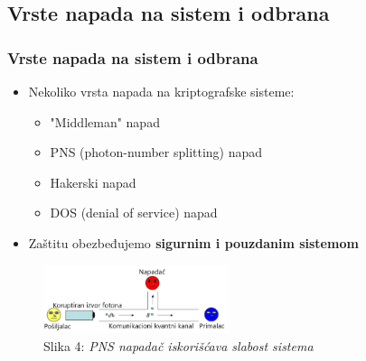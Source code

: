 \documentclass{beamer}
\begin{document}
\subsection{Vrste napada na sistem i odbrana}
\begin{frame}[fragile]\frametitle{Vrste napada na sistem i odbrana}
\bigskip
	\begin{itemize}	
	  \item Nekoliko vrsta napada na kriptografske sisteme:
        \begin{itemize}
            \item "Middleman" napad
            \item PNS (photon-number splitting) napad
            \item Hakerski napad
            \item DOS (denial of service) napad
        \end{itemize}
        \item Zaštitu obezbeđujemo\bf{ sigurnim i pouzdanim sistemom} 
        
	\end{itemize}
    \begin{figure}[h!]
        \centering\includegraphics[height=2cm]{sl3.png} 
        \caption{Slika 4: \emph{PNS napadač iskorišćava slabost sistema}}
        \label{fig:pns}
        \end{figure}
\end{frame}
\end{document}

